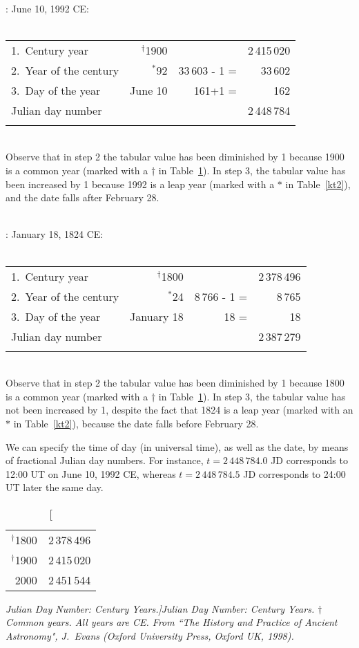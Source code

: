~\\
: June 10, 1992 CE:\\~\\
\begin{tabular}{lrrr}
1.~Century year & $^\dag$1900 &&2\,415\,020\\
2.~Year of the century & $^\ast$92 & 33\,603 - 1 =& 33\,602\\
3.~Day of the year & June 10 & 161+1 = & 162\\\cline{4-4}
Julian day number&&&2\,448\,784\\
&&&\\
\end{tabular}\\
Observe that in step 2 the tabular value has been diminished by 1 because 1900
is a common year (marked with a $\dag$ in Table~\ref{kt1}). In step 3, the
tabular value has been increased by 1 because 1992 is a leap year (marked with a $\ast$ in Table~\ref{kt2}), and the
date falls after February 28.

~\\
: January 18, 1824 CE:\\~\\
\begin{tabular}{lrrr}
1.~Century year & $^\dag$1800 &&2\,378\,496\\
2.~Year of the century & $^\ast$24 & 8\,766 - 1 =& 8\,765\\
3.~Day of the year & January 18 & 18 = & 18\\\cline{4-4}
Julian day number&&&2\,387\,279\\
&&&\\
\end{tabular}\\
Observe that in step 2 the tabular value has been diminished by 1 because 1800
is a common year (marked with a $\dag$ in Table~\ref{kt1}). In step 3, the
tabular value has not been increased by 1, despite the fact that 1824 is a leap year (marked with an $\ast$ in Table~\ref{kt2}),  because the
date falls before February 28.

We can specify the time of day (in universal time), as well as the date, 
by means of fractional Julian day numbers. For instance,
$t=2\,448\,784.0$ JD corresponds to 12:00 UT  on  June 10, 1992 CE, whereas
$t=2\,448\,784.5$ JD corresponds to 24:00 UT later the same day.

\newpage
\begin{table}\centering
\begin{tabular}{rr}
 $^\dag$1800 &  2\,378\,496\\
 $^\dag$1900 & 2\,415\,020\\
 2000 & 2\,451\,544\\
\end{tabular}
\caption [\em Julian Day Number: Century Years.]{\em Julian Day Number: Century Years. $\dag$\,Common years. All years are CE. From ``The History
and Practice of Ancient Astronomy", J.~Evans (Oxford University Press, Oxford UK, 1998).}\label{kt1}
\end{table}

